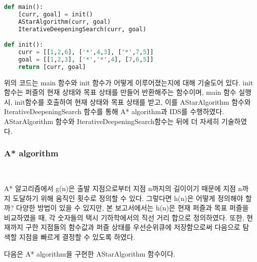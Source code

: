 \documentclass[manuscript,screen,review]{acmart}
\begin{document}
\begin{lstlisting}[language=python, caption=main and init function] 
def main():
    [curr, goal] = init()
    AStarAlgorithm(curr, goal)
    IterativeDeepeningSearch(curr, goal)

def init():
    curr = [[1,2,6], ['*',4,3], ['*',7,5]]
    goal = [[1,2,3], ['*','*',4], [7,6,5]]
    return [curr, goal]
\end{lstlisting}

위의 코드는 main 함수와 init 함수가 어떻게 이루어졌는지에 대해 기술도어 있다. init 함수는 퍼즐의 현재 상태와 목표 상태를 만들어 반환해주는 함수이며, main 함수 실행 시, init함수를 호출하여 현재 상태와 목표 상태를 받고, 이를 AStarAlgorithm 함수와 IterativeDeepeningSearch 함수를 통해 A* algorithm과 IDS를 수행하였다.
AStarAlgorithm 함수와 IterativeDeepeningSearch함수는 뒤에 더 자세히 기술하였다.

\subsubsection{A* algorithm}\

A* 알고리즘에서 g(n)은 출발 지점으로부터 지점 n까지의 길이이기 때문에 지점 n까지 도달하기 위해 움직인 횟수로 정의할 수 있다. 그렇다면 h(n)은 어떻게 정의해야 할까? 다양한 방법이 있을 수 있지만, 본 보고서에서는 h(n)은 현재 퍼즐과 목표 퍼즐을 비교하였을 때, 각 숫자들의 택시 기하학에서의 직선 거리 합으로 정의하였다. 또한, 현재까지 구한 지점들의 함수값과 퍼즐 상태를 우선순위큐에 저장함으로써 다음으로 탐색할 지점을 빠르게 결정할 수 있도록 하였다.

다음은 A* algorithm을 구현한 AStarAlgorithm 함수이다.
\end{document}
